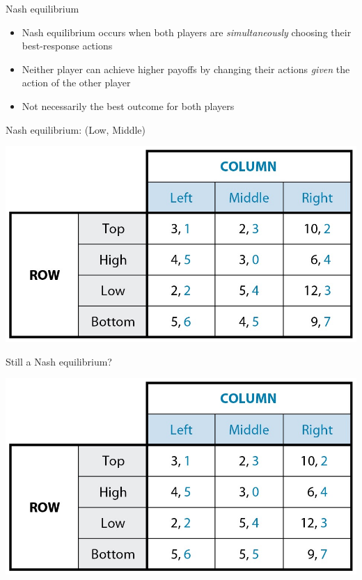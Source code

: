 \documentclass[10pt]{beamer}
\begin{document}
\begin{frame}[label={sec:org83a0cbb}]{}
\alert{Nash equilibrium}
\begin{itemize}
\item Nash equilibrium occurs when both players are \emph{simultaneously} choosing their best-response actions
\item Neither player can achieve higher payoffs by changing their actions \emph{given} the action of the other player
\item Not necessarily the best outcome for both players
\end{itemize}
\end{frame}

\begin{frame}[label={sec:org31188d4}]{Nash equilibrium: (Low, Middle)}
\begin{center}
\includegraphics[width=.75\textwidth]{./img/GAMES4_FIG04.01.jpg}
\end{center}
\end{frame}

\begin{frame}[label={sec:org2761500}]{Still a Nash equilibrium?}
\begin{center}
\includegraphics[width=.75\textwidth]{./img/GAMES4_FIG04.03.jpg}
\end{center}
\end{frame}
\end{document}
